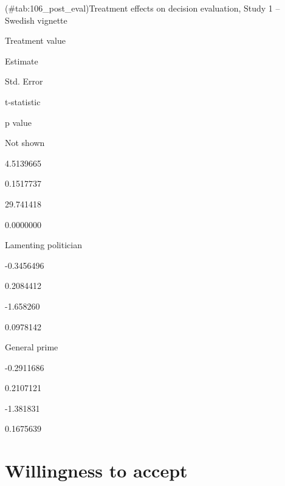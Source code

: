 \documentclass[]{book}
\begin{document}
(\#tab:106\_post\_eval)Treatment effects on decision evaluation, Study 1
-- Swedish vignette

Treatment value

Estimate

Std. Error

t-statistic

p value

Not shown

4.5139665

0.1517737

29.741418

0.0000000

Lamenting politician

-0.3456496

0.2084412

-1.658260

0.0978142

General prime

-0.2911686

0.2107121

-1.381831

0.1675639

\section{Willingness to accept}\label{willingness-to-accept-2}
\end{document}
